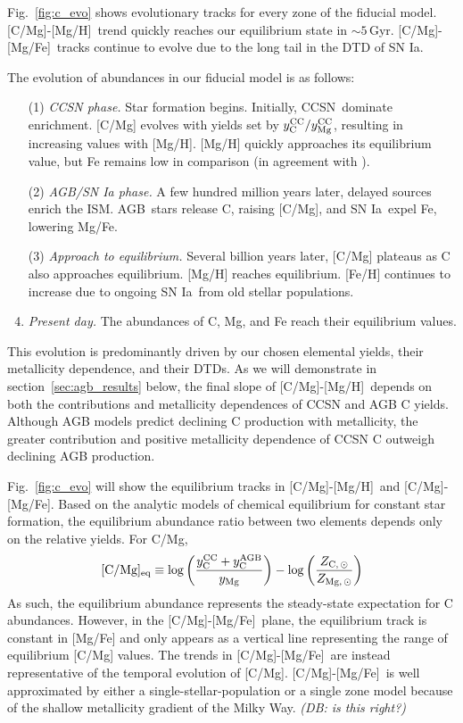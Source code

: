 \documentclass[fleqn,
usenatbib]{mnras}
\makeatletter
\newcommand{\agb}{AGB}
\newcommand{\cc}{CCSN}
\newcommand{\ia}{SN Ia}
\newcommand{\caah}{[C/Mg]-[Mg/H]}
\newcommand{\caafe}{[C/Mg]-[Mg/Fe]}
\newcommand{\Ycc}{{y_{\rm C}^{\rm CC}}}
\newcommand{\Yoc}{{y_{\rm Mg}^{\rm CC}}}
\newcommand{\Ycagb}{{y_{\rm C}^{\rm AGB}}}
\newcommand{\about}[1]{${\sim} #1$}
\DeclareRobustCommand\citepos
  {\begingroup
   \let\NAT@nmfmt\NAT@posfmt%
   \NAT@swafalse\let\NAT@ctype\z@\NAT@partrue
   \@ifstar{\NAT@fulltrue\NAT@citetp}{\NAT@fullfalse\NAT@citetp}}
\let\NAT@orig@nmfmt\NAT@nmfmt
\def\NAT@posfmt#1{\NAT@orig@nmfmt{#1's}}
\newcommand{\dbnote}[1]{ {\color{Thistle} \textit{\small (DB: #1)}} }
\makeatother
\begin{document}
Fig.~\ref{fig:c_evo} shows evolutionary tracks for every zone of the fiducial model.
\caah\ trend quickly reaches our equilibrium state in \about{5}\,Gyr. \caafe\ tracks continue to evolve due to the long tail in the DTD of \ia. 


The evolution of abundances in our fiducial model is as follows:
\begin{enumerate}
    \item[(1)] {\it CCSN phase.} Star formation begins. Initially, \cc\ dominate enrichment. [C/Mg] evolves with yields set by $\Ycc/\Yoc$, resulting in increasing values with [Mg/H].  [Mg/H] quickly approaches its equilibrium value, but Fe remains low in comparison (in agreement with \citealt{WAF17}).
    \item[(2)]  {\it AGB/SN Ia phase.} A few hundred million years later, delayed sources enrich the ISM. \agb\ stars release C, raising [C/Mg], and \ia\ expel Fe, lowering Mg/Fe. 
    \item[(3)] {\it Approach to equilibrium.} Several billion years later, [C/Mg] plateaus as C also approaches equilibrium. [Mg/H] reaches equilibrium. [Fe/H] continues to increase due to ongoing \ia\ from old stellar populations. 
    \item {\it Present day.} The abundances of C, Mg, and Fe reach their equilibrium values. 

\end{enumerate}
This evolution is predominantly driven by our chosen elemental yields, their
metallicity dependence, and their DTDs.
As we will demonstrate in section~\ref{sec:agb_results} below, the final slope of \caah\ depends on both the contributions and metallicity dependences of CCSN and AGB C yields. Although AGB models predict declining C production with metallicity, the greater contribution and positive metallicity dependence of CCSN C outweigh declining AGB production.



 Fig.~\ref{fig:c_evo} {\color{red} will} show the  equilibrium tracks in \caah\, and \caafe. Based on the \citepos{WAF17} analytic models of chemical equilibrium for constant star formation, the equilibrium abundance ratio between two elements depends only on the relative yields. For C/Mg, 
\begin{equation}\label{eq:equilibrium_yields}
    {\rm [C/Mg]_{eq}} \equiv \log \left(\frac{\Ycc + \Ycagb }{y_{\rm Mg}}\right) - \log \left(\frac{Z_{\rm C,\,\odot}}{Z_{\rm Mg,\,\odot}}\right)
\end{equation}
As such, the equilibrium abundance represents the steady-state expectation for C abundances.  
However, in the \caafe\ plane, the equilibrium track is constant in [Mg/Fe] and only appears as a vertical line representing the range of equilibrium [C/Mg] values. The trends in \caafe\ are instead representative of the temporal evolution of [C/Mg].  \caafe\ is well approximated by either a single-stellar-population or a single zone model because of the shallow metallicity gradient of the Milky Way. \dbnote{is this right?}
\end{document}
